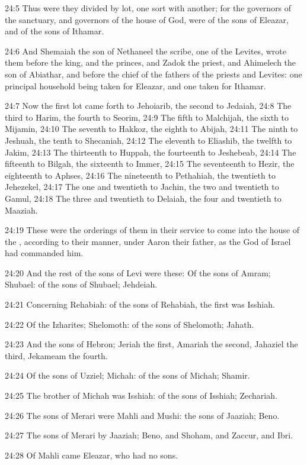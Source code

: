 24:5 Thus were they divided by lot, one sort with another; for the
governors of the sanctuary, and governors of the house of God, were of
the sons of Eleazar, and of the sons of Ithamar.

24:6 And Shemaiah the son of Nethaneel the scribe, one of the Levites,
wrote them before the king, and the princes, and Zadok the priest, and
Ahimelech the son of Abiathar, and before the chief of the fathers of
the priests and Levites: one principal household being taken for
Eleazar, and one taken for Ithamar.

24:7 Now the first lot came forth to Jehoiarib, the second to Jedaiah,
24:8 The third to Harim, the fourth to Seorim, 24:9 The fifth to
Malchijah, the sixth to Mijamin, 24:10 The seventh to Hakkoz, the
eighth to Abijah, 24:11 The ninth to Jeshuah, the tenth to Shecaniah,
24:12 The eleventh to Eliashib, the twelfth to Jakim, 24:13 The
thirteenth to Huppah, the fourteenth to Jeshebeab, 24:14 The fifteenth
to Bilgah, the sixteenth to Immer, 24:15 The seventeenth to Hezir, the
eighteenth to Aphses, 24:16 The nineteenth to Pethahiah, the twentieth
to Jehezekel, 24:17 The one and twentieth to Jachin, the two and
twentieth to Gamul, 24:18 The three and twentieth to Delaiah, the four
and twentieth to Maaziah.

24:19 These were the orderings of them in their service to come into
the house of the \LORD, according to their manner, under Aaron their
father, as the \LORD God of Israel had commanded him.

24:20 And the rest of the sons of Levi were these: Of the sons of
Amram; Shubael: of the sons of Shubael; Jehdeiah.

24:21 Concerning Rehabiah: of the sons of Rehabiah, the first was
Isshiah.

24:22 Of the Izharites; Shelomoth: of the sons of Shelomoth; Jahath.

24:23 And the sons of Hebron; Jeriah the first, Amariah the second,
Jahaziel the third, Jekameam the fourth.

24:24 Of the sons of Uzziel; Michah: of the sons of Michah; Shamir.

24:25 The brother of Michah was Isshiah: of the sons of Isshiah;
Zechariah.

24:26 The sons of Merari were Mahli and Mushi: the sons of Jaaziah;
Beno.

24:27 The sons of Merari by Jaaziah; Beno, and Shoham, and Zaccur, and
Ibri.

24:28 Of Mahli came Eleazar, who had no sons.

